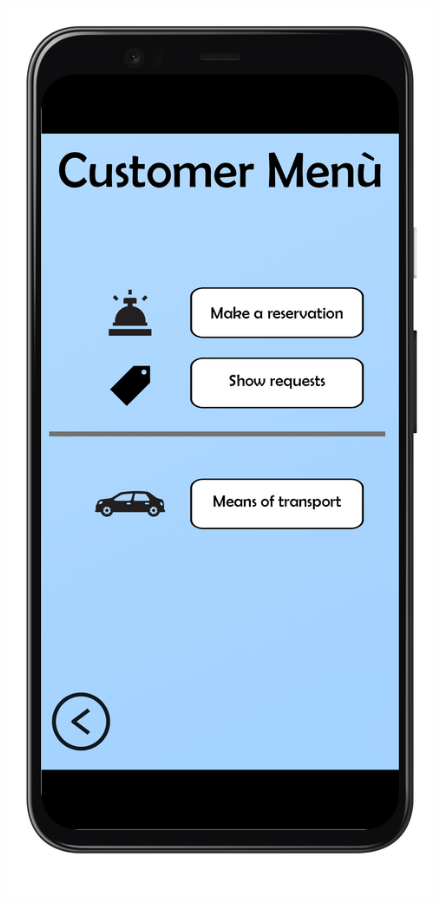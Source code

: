 \documentclass{article}
\begin{document}
		\begin{figure}[!h]
			\centering
			\begin{minipage}[!h]{0.4\textwidth}
				\includegraphics[width=\textwidth]{../Mockups/MenuCustomer.png}

\end{minipage}
\end{figure}
\end{document}
